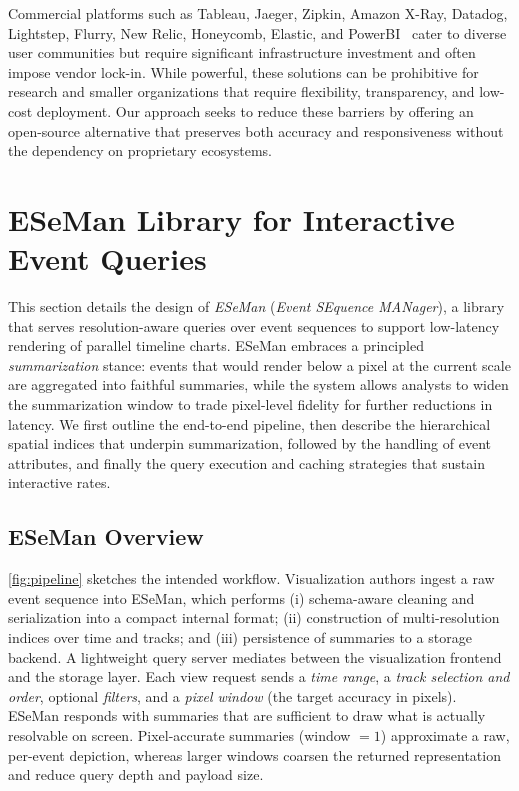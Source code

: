 \begin{refsection}
Commercial platforms such as Tableau, Jaeger, Zipkin, Amazon X-Ray, Datadog, Lightstep, Flurry, New Relic, Honeycomb, Elastic, and PowerBI~\cite{Tableau, Jaeger, Zipkin, AmazonXRay, Datadog, Lightstep, Flurry, NewRelic, Honeycomb, Elastic, powerbi} cater to diverse user communities but require significant infrastructure investment and often impose vendor lock-in. While powerful, these solutions can be prohibitive for research and smaller organizations that require flexibility, transparency, and low-cost deployment. Our approach seeks to reduce these barriers by offering an open-source alternative that preserves both accuracy and responsiveness without the dependency on proprietary ecosystems.


\section{ESeMan Library for Interactive Event Queries}
\label{sec:solution}

This section details the design of \emph{ESeMan} (\textit{Event SEquence MANager}), a library that serves resolution-aware queries over event sequences to support low-latency rendering of parallel timeline charts. ESeMan embraces a principled \emph{summarization} stance: events that would render below a pixel at the current scale are aggregated into faithful summaries, while the system allows analysts to widen the summarization window to trade pixel-level fidelity for further reductions in latency. We first outline the end-to-end pipeline, then describe the hierarchical spatial indices that underpin summarization, followed by the handling of event attributes, and finally the query execution and caching strategies that sustain interactive rates.

\subsection{ESeMan Overview}
\label{subsec:overview}

\autoref{fig:pipeline} sketches the intended workflow. Visualization authors ingest a raw event sequence into ESeMan, which performs (i) schema-aware cleaning and serialization into a compact internal format; (ii) construction of multi-resolution indices over time and tracks; and (iii) persistence of summaries to a storage backend. A lightweight query server mediates between the visualization frontend and the storage layer. Each view request sends a \emph{time range}, a \emph{track selection and order}, optional \emph{filters}, and a \emph{pixel window} (the target accuracy in pixels). ESeMan responds with summaries that are sufficient to draw what is actually resolvable on screen. Pixel-accurate summaries (window $=1$) approximate a raw, per-event depiction, whereas larger windows coarsen the returned representation and reduce query depth and payload size.


\end{refsection}

